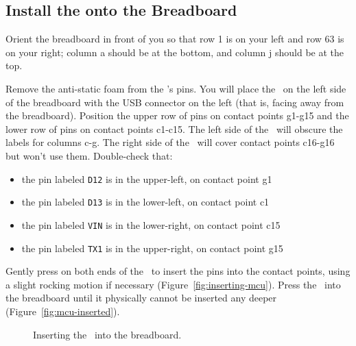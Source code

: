 \subsection{Install the \developmentboard onto the Breadboard}

Orient the breadboard in front of you so that row 1 is on your left and row 63 is on your right;
column a should be at the bottom, and column j should be at the top.

Remove the anti-static foam from the \developmentboard's pins.
You will place the \developmentboard\ on the left side of the breadboard with the USB connector on the left (that is, facing away from the breadboard).
Position the upper row of pins on contact points g1-g15 and the lower row of pins on contact points c1-c15.
The left side of the \developmentboard\ will obscure the labels for columns c-g.
The right side of the \developmentboard\ will cover contact points c16-g16 but won't use them.
Double-check that:
\begin{itemize}
    \item the pin labeled \texttt{D12} is in the upper-left, on contact point g1
    \item the pin labeled \texttt{D13} is in the lower-left, on contact point c1
    \item the pin labeled \texttt{VIN} is in the lower-right, on contact point c15
    \item the pin labeled \texttt{TX1} is in the upper-right, on contact point g15
\end{itemize}

Gently press on both ends of the \developmentboard\ to insert the pins into the contact points, using a slight rocking motion if necessary (Figure~\ref{fig:inserting-mcu}).
Press the \developmentboard\ into the breadboard until it physically cannot be inserted any deeper (Figure~\ref{fig:mcu-inserted}).

\begin{figure}
    \centering
    \hfil
    \caption{Inserting the \developmentboard\ into the breadboard.}
\end{figure}

